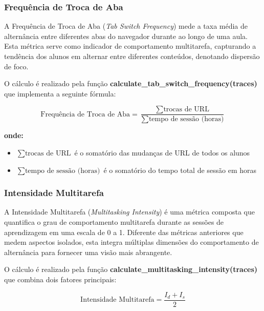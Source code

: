 \subsubsection{Frequência de Troca de Aba}

A Frequência de Troca de Aba (\textit{Tab Switch Frequency}) mede a taxa média de alternância entre diferentes abas do navegador durante ao longo de uma aula. Esta métrica serve como indicador de comportamento multitarefa, capturando a tendência dos alunos em alternar entre diferentes conteúdos, denotando dispersão de foco.

O cálculo é realizado pela função \textbf{calculate\_tab\_switch\_frequency(traces)} que implementa a seguinte fórmula:

\begin{equation}
\text{Frequência de Troca de Aba} = \frac{\sum \text{trocas de URL}}{\sum \text{tempo de sessão (horas)}}
\end{equation}

\textbf{onde:}
\begin{itemize}
    \item $\sum \text{trocas de URL}$ é o somatório das mudanças de URL de todos os alunos
    \item $\sum \text{tempo de sessão (horas)}$ é o somatório do tempo total de sessão em horas
\end{itemize}

% 

\subsubsection{Intensidade Multitarefa}

A Intensidade Multitarefa (\textit{Multitasking Intensity}) é uma métrica composta que quantifica o grau de comportamento multitarefa durante as sessões de aprendizagem em uma escala de 0 a 1. Diferente das métricas anteriores que medem aspectos isolados, esta integra múltiplas dimensões do comportamento de alternância para fornecer uma visão mais abrangente.

O cálculo é realizado pela função \textbf{calculate\_multitasking\_intensity(traces)} que combina dois fatores principais:

\begin{equation}
\text{Intensidade Multitarefa} = \frac{I_d + I_s}{2}
\end{equation}

